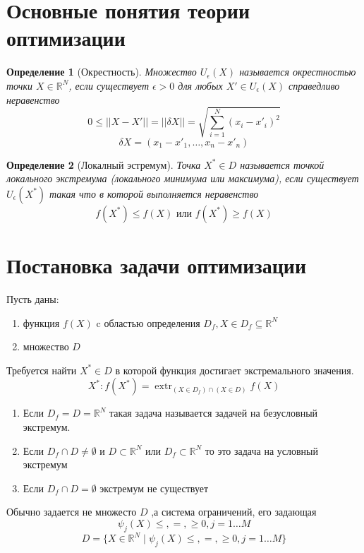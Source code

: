 \documentclass[14pt]{extarticle}
\title{}
\author{}
\date{}
\newtheorem{definiiton}{Определение}
\DeclareMathOperator{\extr}{extr}
\begin{document}
	\maketitle
	\section{Основные понятия теории оптимизации}
	\begin{definiiton}[Окрестность]
		Множество $U_{\epsilon}(X)$ называется
		окрестностью точки $X \in \mathbb{R}^{N}$,
		если существует $\epsilon >0$
		для любых $X' \in U_{\epsilon}(X)$ 
		справедливо неравенство 
		\begin{equation}
			0 \le  || X-X'|| =|| \delta X|| =
			\sqrt{\sum_{i=1}^{N} (x_{i} - x'_{i})^2} 
		\end{equation}
		\begin{equation}
			\delta X = (x_1-x'_{1}, \dots, x_{n} -x'_{n})
		\end{equation}
	\end{definiiton}
	\begin{definiiton}[Локалный эстремум]
	Точка $X^{*} \in D$ называется точкой локального
	экстремума (локального минимума или максимума),
	если существует $U_{\epsilon}(X^{*})$ такая что в которой выполняется неравенство
	\begin{equation}
		f(X^{*}) \le f(X) \text{~или~} f(X^{*}) \ge  f(X)
	\end{equation}
	\end{definiiton}
	\section{Постановка задачи оптимизации}
	Пусть даны:
	\begin{enumerate}
		\item функция $f(X)$ c областью определения
			 $D_{f},X \in D_{f} \subseteq \mathbb{R}^{N}$
		 \item множество $D$
	\end{enumerate}
	Требуется найти $X^{*} \in D$ в которой функция достигает
	экстремального значения.
	\begin{equation}
		X^{*}: f(X^{*}) = \extr_{(X \in D_{f}) \cap (X \in D)} f(X)
	\end{equation}
	\begin{enumerate}
		\item Если $D_{f} = D = \mathbb{R}^{N}$ такая задача
			называется задачей на безусловный экстремум.
		\item Если $D_{f} \cap D \neq \emptyset$ и $D \subset \mathbb{R}^{N}$ или $D_{f} \subset \mathbb{R}^{N}$ то это задача на условный экстремум
		\item Если $D_{f} \cap D = \emptyset$ экстремум не существует
	\end{enumerate}
	Обычно задается не множесто $D$ ,а система
	ограничений, его задающая  
	\begin{equation}
		\psi_{j}(X) \le ,=,\ge 0,j = 1 \dots M
	\end{equation}
	\begin{equation}
		D = \{X \in \mathbb{R}^{N} \mid  \psi_{j}(X) \le ,=,\ge 0, j = 1 \dots M\}
	\end{equation}
\end{document}
